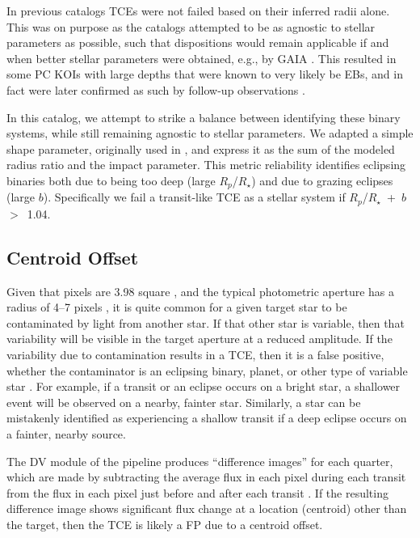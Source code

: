 In previous catalogs \citep{Rowe2015cat,Mullally2015cat,Coughlin2016} TCEs were not failed based on their inferred radii alone. This was on purpose as the catalogs attempted to be as agnostic to stellar parameters as possible, such that dispositions would remain applicable if and when better stellar parameters were obtained, e.g., by GAIA \citep{Cacciari2009,Mignard2005}. This resulted in some PC KOIs with large depths that were known to very likely be EBs, and in fact were later confirmed as such by follow-up observations \citep{Santerne2016}.

In this catalog, we attempt to strike a balance between identifying these binary systems, while still remaining agnostic to stellar parameters. We adapted a simple shape parameter, originally used in \citet{Batalha2013}, and express it as the sum of the modeled radius ratio and the impact parameter. This metric reliability identifies eclipsing binaries both due to being too deep (large $R_{p}$/$R_{\star}$) and due to grazing eclipses (large $b$). Specifically we fail a transit-like TCE as a stellar system if $R_{p}$/$R_{\star}$~+~$b$~$>$~1.04.



\subsection{Centroid Offset}

Given that \keplers{} pixels are 3.98\arcsec{} square \citep{Koch2010}, and the typical photometric aperture has a radius of 4--7 pixels \citep{Bryson2010b}, it is quite common for a given target star to be contaminated by light from another star. If that other star is variable, then that variability will be visible in the target aperture at a reduced amplitude. If the variability due to contamination results in a TCE, then it is a false positive, whether the contaminator is an eclipsing binary, planet, or other type of variable star \citep{Bryson2013}. For example, if a transit or an eclipse occurs on a bright star, a shallower event will be observed on a nearby, fainter star. Similarly, a star can be mistakenly identified as experiencing a shallow transit if a deep eclipse occurs on a fainter, nearby source.



The DV module of the \kepler{} pipeline produces ``difference images'' for each quarter, which are made by subtracting the average flux in each pixel during each transit from the flux in each pixel just before and after each transit \citep{Bryson2013}. If the resulting difference image shows significant flux change at a location (centroid) other than the target, then the TCE is likely a FP due to a centroid offset.


